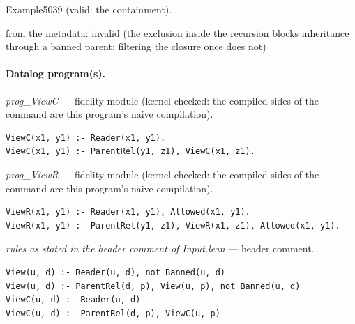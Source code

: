 \documentclass[10pt]{article}
\begin{document}
\begin{description}[leftmargin=2.6cm,style=nextline,itemsep=1pt]
\item[Twin] Example5039 (valid: the containment).

\item[Obstruction note] from the metadata: invalid (the exclusion inside the recursion blocks inheritance through a banned parent; filtering the closure once does not)

\end{description}

\paragraph{Datalog program(s).}

{\raggedright\textit{prog\_ViewC} --- fidelity module (kernel-checked: the compiled sides of the command are this program's naive compilation).\par}

\begin{Verbatim}[fontsize=\scriptsize,breaklines=true,breakanywhere=true,frame=single,framesep=1.5mm]
ViewC(x1, y1) :- Reader(x1, y1).
ViewC(x1, y1) :- ParentRel(y1, z1), ViewC(x1, z1).
\end{Verbatim}

{\raggedright\textit{prog\_ViewR} --- fidelity module (kernel-checked: the compiled sides of the command are this program's naive compilation).\par}

\begin{Verbatim}[fontsize=\scriptsize,breaklines=true,breakanywhere=true,frame=single,framesep=1.5mm]
ViewR(x1, y1) :- Reader(x1, y1), Allowed(x1, y1).
ViewR(x1, y1) :- ParentRel(y1, z1), ViewR(x1, z1), Allowed(x1, y1).
\end{Verbatim}

{\raggedright\textit{rules as stated in the header comment of Input.lean} --- header comment.\par}

\begin{Verbatim}[fontsize=\scriptsize,breaklines=true,breakanywhere=true,frame=single,framesep=1.5mm]
View(u, d) :- Reader(u, d), not Banned(u, d)
View(u, d) :- ParentRel(d, p), View(u, p), not Banned(u, d)
ViewC(u, d) :- Reader(u, d)
ViewC(u, d) :- ParentRel(d, p), ViewC(u, p)
\end{Verbatim}
\end{document}
